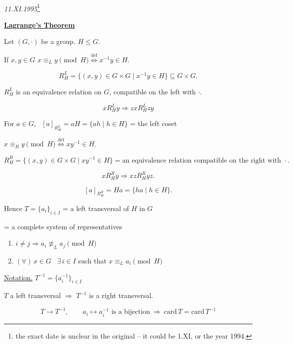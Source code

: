 \documentclass[12pt]{article}
\begin{document}
\begin{center}
\\[2pt]
\end{center}
\begin{flushright}
\textit{11.XI.1995}\footnote{the exact date is unclear in the original -- it could be 1.XI, or the year 1994.}
\end{flushright}

\bigskip
\noindent\underline{\textbf{Lagrange's Theorem}}

\bigskip
\noindent Let $(G,\cdot)$ be a group. $H\leq G$.

\noindent If $x,y\in G$ \quad $x\equiv_L y \pmod H \overset{\text{def}}{\Longleftrightarrow} x^{-1}y\in H$.

\[
R_H^L = \{(x,y)\in G\times G \mid x^{-1}y\in H\} \subseteq G\times G.
\]

\noindent $R_H^L$ is an equivalence relation on $G$, compatible on the left with $\cdot$.

\[
xR_H^L y \Rightarrow zxR_H^L zy
\]

\noindent For $a\in G$, \ $[a]_{R_H^L} = aH = \{ah \mid h\in H\}$ = the left coset

\bigskip
\noindent $x\equiv_R y \pmod H \overset{\text{def}}{\Longleftrightarrow} xy^{-1}\in H$.

\[
R_H^R = \{(x,y)\in G\times G \mid xy^{-1}\in H\} = \text{an equivalence relation compatible on the right with } \cdot.
\]

\[
xR_H^R y \Rightarrow xzR_H^R yz.
\]

\[
[a]_{R_H^R} = Ha = \{ha \mid h\in H\}.
\]

\bigskip
\noindent Hence $T=\{a_i\}_{i\in I}$ = a left transversal of $H$ in $G$

\noindent = a complete system of representatives

\begin{enumerate}
\item[1)] $i\neq j \Rightarrow a_i \not\equiv_L a_j \pmod H$
\item[2)] $(\forall)\, x\in G$ \ $\exists\, i\in I$ such that $x\equiv_L a_i \pmod H$
\end{enumerate}

\bigskip
\noindent\underline{Notation.} $T^{-1} = \{a_i^{-1}\}_{i\in I}$

\noindent $T$ a left transversal $\Rightarrow$ $T^{-1}$ is a right transversal.

\[
T \xrightarrow{\ } T^{-1}, \qquad a_i \mapsto a_i^{-1} \text{ is a bijection} \ \Rightarrow \ \text{card}\, T = \text{card}\, T^{-1}
\]
\end{document}
